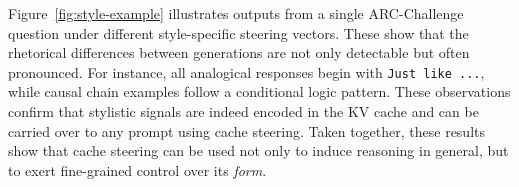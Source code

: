\documentclass{article} %
\begin{document}
Figure~\ref{fig:style-example} illustrates outputs from a single ARC-Challenge question under different style-specific steering vectors. These show that the rhetorical
differences between generations are not only detectable but often pronounced. For instance, all analogical responses begin with \texttt{Just like ...}, while causal chain examples follow a conditional logic pattern. These observations confirm that stylistic
signals are indeed encoded in the KV cache and can be carried over to any prompt using cache steering. Taken together, these results show that cache steering can be used not only to induce reasoning in general, but to exert fine-grained control over its \textit{form}.





\end{document}

